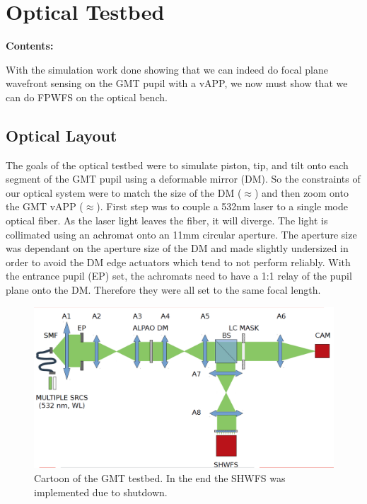 
\chapter{Optical Testbed} %
\noindent\textbf{\large Contents:}

\noindent\hrulefill
\noindent\startcontents[chapters]
\noindent{}
\noindent\hrulefill
\label{Chapter3} %



With the simulation work done showing that we can indeed do focal plane wavefront sensing on the GMT pupil with a vAPP, we now must show that we can do FPWFS on the optical bench.

\section{Optical Layout}
\label{sec:optical_layout}

The goals of the optical testbed were to simulate piston, tip, and tilt onto each segment of the GMT pupil using a deformable mirror (DM).  So the constraints of our optical system were to match the size of the DM ($\approx$\diameter 11mm) and then zoom onto the GMT vAPP ($\approx$\diameter 6mm).  First step was to couple a 532nm laser to a single mode optical fiber.  As the laser light leaves the fiber, it will diverge.  The light is collimated using an achromat onto an 11mm circular aperture.  The aperture size was dependant on the aperture size of the DM and made slightly undersized in order to avoid the DM edge actuators which tend to not perform reliably.  With the entrance pupil (EP) set, the achromats need to have a 1:1 relay of the pupil plane onto the DM.  Therefore they were all set to the same focal length.


\begin{figure}[H]
    \centering
    \includegraphics[width = 12cm]{Figures/optical_bed.png}
    \caption{Cartoon of the GMT testbed.  In the end the SHWFS was implemented due to shutdown.}
    \label{fig:optical_layout}
\end{figure}


